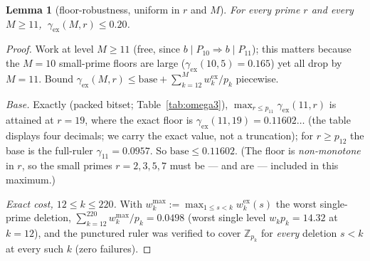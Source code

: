 \documentclass[11pt]{amsart}
\theoremstyle{plain}
\newtheorem{lemma}[theorem]{Lemma}
\theoremstyle{definition}
\newcommand{\Z}{\mathbb{Z}}
\begin{document}
\begin{lemma}[floor-robustness, uniform in $r$ and $M$]\label{lem:Aunif}
For every prime $r$ and every $M\ge11$, $\ \gamma_{\mathrm{ex}}(M,r)\le0.20$.
\end{lemma}
\begin{proof}
Work at level $M\ge11$ (free, since $b\mid P_{10}\Rightarrow b\mid P_{11}$); this
matters because the $M=10$ small-prime floors are large
($\gamma_{\mathrm{ex}}(10,5)=0.165$) yet all drop by $M=11$.  Bound
$\gamma_{\mathrm{ex}}(M,r)\le\mathrm{base}+\sum_{k=12}^{M}w_k^{\mathrm{ex}}/p_k$
piecewise.

\emph{Base.}  Exactly (packed bitset; Table~\ref{tab:omega3}),
$\max_{r\le p_{11}}\gamma_{\mathrm{ex}}(11,r)$ is attained at $r=19$, where the
exact floor is $\gamma_{\mathrm{ex}}(11,19)=0.11602\ldots$ (the table displays four
decimals; we carry the exact value, not a truncation); for $r\ge p_{12}$ the base
is the full-ruler $\gamma_{11}=0.0957$.  So $\mathrm{base}\le0.11602$.  (The floor
is \emph{non-monotone} in $r$, so the small primes $r=2,3,5,7$ must be --- and are
--- included in this maximum.)

\emph{Exact cost, $12\le k\le220$.}  With
$w_k^{\max}:=\max_{1\le s<k}w_k^{\mathrm{ex}}(s)$ the worst single-prime deletion,
$\sum_{k=12}^{220}w_k^{\max}/p_k=0.0498$ (worst single level $w_kp_k=14.32$ at
$k=12$), and the punctured ruler was verified to cover $\Z_{p_k}$ for \emph{every}
deletion $s<k$ at every such $k$ (zero failures).


\end{proof}
\end{document}
